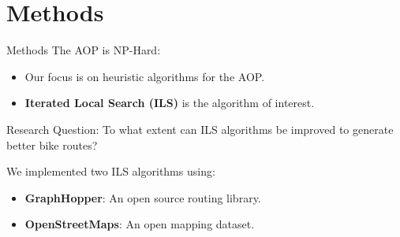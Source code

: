 \documentclass{beamer}
\begin{document}

\section{Methods}
\begin{frame}{Methods}
    The AOP is NP-Hard:
    \begin{itemize}
        \item Our focus is on heuristic algorithms for the AOP.
        \item \textbf{Iterated Local Search (ILS)} is the algorithm of interest.
    \end{itemize}
    
    \begin{alertblock}{Research Question:}
        To what extent can ILS algorithms be improved to generate better bike routes?
    \end{alertblock}
    \vspace{0.3cm}
    We implemented two ILS algorithms using:
    \begin{itemize}
        \item \textbf{GraphHopper}: An open source routing library.
        \item \textbf{OpenStreetMaps}: An open mapping dataset.
    \end{itemize}
    

\end{frame}
\end{document}
